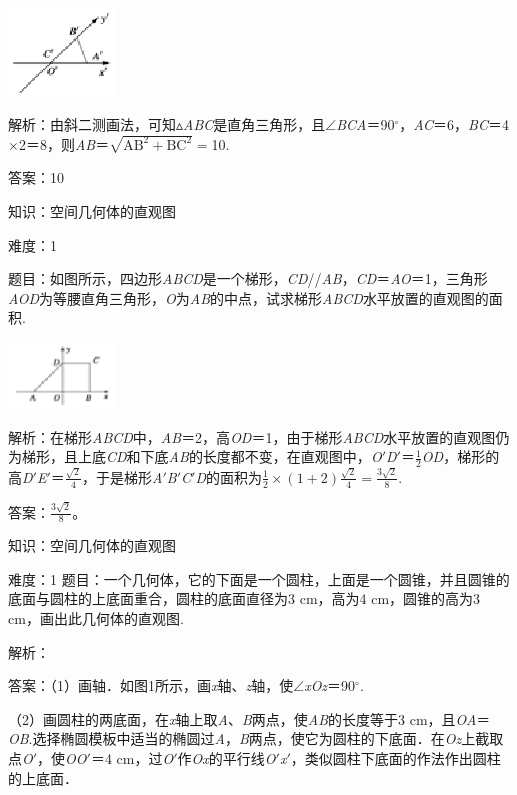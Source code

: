 \documentclass{article} %
\begin{document}
\includegraphics*[width=1.13in, height=0.92in, keepaspectratio=false]{image49}

解析：由斜二测画法，可知$\mathrm{\vartriangle}$\textit{ABC}是直角三角形，且$\mathrm{\angle}$\textit{BCA}＝90$\mathrm{{}^\circ}$，\textit{AC}＝6，\textit{BC}＝4$\mathrm{\times}$2＝8，则\textit{AB}＝$\sqrt{\text{AB}^2+\text{BC}^2}=$10.

答案：10

知识：空间几何体的直观图

难度：1

题目：如图所示，四边形\textit{ABCD}是一个梯形，\textit{CD}//\textit{AB}，\textit{CD}＝\textit{AO}＝1，三角形\textit{AOD}为等腰直角三角形，\textit{O}为\textit{AB}的中点，试求梯形\textit{ABCD}水平放置的直观图的面积.

\includegraphics*[width=1.15in, height=0.70in, keepaspectratio=false]{image50}

解析：在梯形\textit{ABCD}中，\textit{AB}＝2，高\textit{OD}＝1，由于梯形\textit{ABCD}水平放置的直观图仍为梯形，且上底\textit{CD}和下底\textit{AB}的长度都不变，在直观图中，\textit{O}$'$\textit{D}$'$＝$\frac{1}{2}$\textit{OD}，梯形的高\textit{D}$'$\textit{E}$'$＝$\frac{\sqrt{2}}{4}$，于是梯形\textit{A}$'$\textit{B}$'$\textit{C}$'$\textit{D}的面积为$\frac{1}{2}\times(1+2)\frac{\sqrt{2}}{4}= \frac{3\sqrt{2}}{8}$.

答案：$\frac{3\sqrt{2}}{8}$。

知识：空间几何体的直观图

难度：1
题目：一个几何体，它的下面是一个圆柱，上面是一个圆锥，并且圆锥的底面与圆柱的上底面重合，圆柱的底面直径为3 cm，高为4 cm，圆锥的高为3 cm，画出此几何体的直观图.

解析：

答案：（1）画轴．如图1所示，画\textit{x}轴、\textit{z}轴，使$\mathrm{\angle}$\textit{xOz}＝90$\mathrm{{}^\circ}$.

（2）画圆柱的两底面，在\textit{x}轴上取\textit{A}、\textit{B}两点，使\textit{AB}的长度等于3 cm，且\textit{OA}＝\textit{OB}.选择椭圆模板中适当的椭圆过\textit{A}，\textit{B}两点，使它为圆柱的下底面．在\textit{Oz}上截取点\textit{O}$'$，使\textit{OO}$'$＝4 cm，过\textit{O}$'$作\textit{Ox}的平行线\textit{O}$'$\textit{x}$'$，类似圆柱下底面的作法作出圆柱的上底面．
\end{document}
